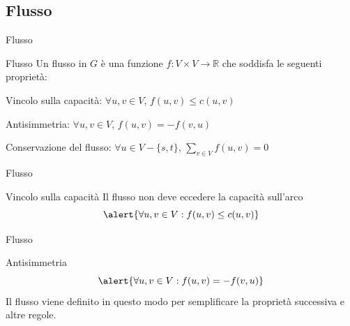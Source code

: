 \subsection{Flusso}

\begin{frame}{Flusso}

\begin{block}{Flusso}
Un \alert{flusso} in $G$ è una funzione \alert{$f: V \times V \rightarrow \mathbb{R}$} 
che soddisfa le seguenti proprietà:
\BIL
\item \alert{Vincolo sulla capacità}: $\forall u,v \in V$, $f(u,v) \leq c(u,v)$

\item \alert{Antisimmetria}: $\forall u,v \in V$, $f(u,v) = -f(v,u)$

\item \alert{Conservazione del flusso}: $\forall u \in V-\{s,t\}$, 
$\sum_{v \in V} f(u,v) = 0$
\EIL
\end{block}

\end{frame}

\begin{frame}{Flusso}

\vspace{-9pt}
\begin{block}{Vincolo sulla capacità}
Il flusso non deve eccedere la capacità sull'arco
\[
\alert{\forall u,v \in V: f(u,v) \leq c(u,v)}
\]
\end{block}

\smallskip
\begin{center}
\end{center}

\end{frame}


\begin{frame}{Flusso}

\vspace{-9pt}
\begin{block}{Antisimmetria}
\[
\alert{\forall u,v \in V: f(u,v) = -f(v,u)}
\]
Il flusso viene definito in questo modo per semplificare la proprietà successiva e altre regole.
\end{block}

\smallskip
\begin{center}
\end{center}

\end{frame}

